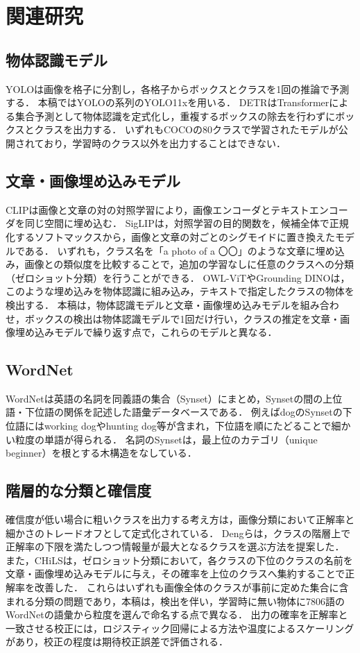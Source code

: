 \section{関連研究}
\subsection{物体認識モデル}
YOLO\cite{ref_YOLO}は画像を格子に分割し，各格子からボックスとクラスを1回の推論で予測する．
本稿ではYOLOの系列のYOLO11x\cite{ref_YOLO11}を用いる．
DETR\cite{ref_DETR}はTransformerによる集合予測として物体認識を定式化し，重複するボックスの除去を行わずにボックスとクラスを出力する．
いずれもCOCO\cite{ref_COCO}の80クラスで学習されたモデルが公開されており，学習時のクラス以外を出力することはできない．

\subsection{文章・画像埋め込みモデル}
CLIP\cite{ref_CLIP}は画像と文章の対の対照学習により，画像エンコーダとテキストエンコーダを同じ空間に埋め込む．
SigLIP\cite{ref_SigLIP}は，対照学習の目的関数を，候補全体で正規化するソフトマックスから，画像と文章の対ごとのシグモイドに置き換えたモデルである．
いずれも，クラス名を「a photo of a 〇〇」のような文章に埋め込み，画像との類似度を比較することで，追加の学習なしに任意のクラスへの分類（ゼロショット分類）を行うことができる．
OWL-ViT\cite{ref_OWLViT}やGrounding DINO\cite{ref_GroundingDINO}は，このような埋め込みを物体認識に組み込み，テキストで指定したクラスの物体を検出する．
本稿は，物体認識モデルと文章・画像埋め込みモデルを組み合わせ，ボックスの検出は物体認識モデルで1回だけ行い，クラスの推定を文章・画像埋め込みモデルで繰り返す点で，これらのモデルと異なる．

\subsection{WordNet}
WordNet\cite{ref_WordNet}は英語の名詞を同義語の集合（Synset）にまとめ，Synsetの間の上位語・下位語の関係を記述した語彙データベースである．
例えばdogのSynsetの下位語にはworking dogやhunting dog等が含まれ，下位語を順にたどることで細かい粒度の単語が得られる．
名詞のSynsetは，最上位のカテゴリ（unique beginner）を根とする木構造をなしている．

\subsection{階層的な分類と確信度}
確信度が低い場合に粗いクラスを出力する考え方は，画像分類において正解率と細かさのトレードオフとして定式化されている\cite{ref_Hedging}．
Dengらは，クラスの階層上で正解率の下限を満たしつつ情報量が最大となるクラスを選ぶ方法を提案した．
また，CHiLS\cite{ref_CHiLS}は，ゼロショット分類において，各クラスの下位のクラスの名前を文章・画像埋め込みモデルに与え，その確率を上位のクラスへ集約することで正解率を改善した．
これらはいずれも画像全体のクラスが事前に定めた集合に含まれる分類の問題であり，本稿は，検出を伴い，学習時に無い物体に7806語のWordNetの語彙から粒度を選んで命名する点で異なる．
出力の確率を正解率と一致させる校正には，ロジスティック回帰による方法\cite{ref_Platt}や温度によるスケーリング\cite{ref_Calibration}があり，校正の程度は期待校正誤差で評価される\cite{ref_Calibration}．
